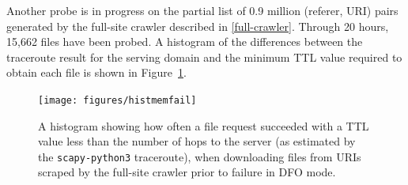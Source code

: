 Another probe is in progress on the partial list of 0.9 million (referer, URI) pairs generated by the full-site crawler described in \autoref{full-crawler}.
Through 20 hours, 15,662 files have been probed.
A histogram of the differences between the traceroute result for the serving domain and the minimum TTL value required to obtain each file is shown in Figure~\ref{fig_histmemfail}.
\begin{figure}
	\texttt{[image: figures/histmemfail]}
	\caption{
		A histogram showing how often a file request succeeded with a TTL value less than the number of hops to the server (as estimated by the \texttt{scapy-python3} traceroute), when downloading files from URIs scraped by the full-site crawler prior to failure in DFO mode.
	}
	\label{fig_histmemfail}
\end{figure}